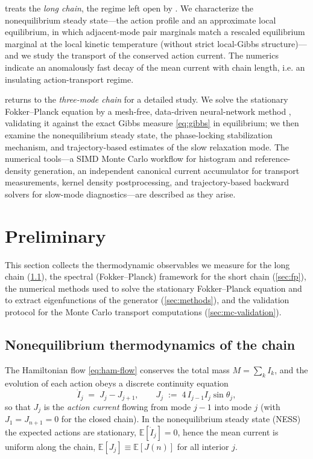\documentclass[11pt,a4paper]{article}
\theoremstyle{definition}
\newcommand{\E}{\mathbb{E}}
\numberwithin{equation}{section}   %
\begin{document}
 treats the \emph{long chain}, the regime left open by
\cite{HLNS}. We characterize the nonequilibrium steady state---the action
profile and an approximate local equilibrium, in which adjacent-mode pair
marginals match a rescaled equilibrium marginal at the local kinetic temperature
(without strict local-Gibbs structure)---and we study the transport of the
conserved action current. The numerics indicate an anomalously fast decay of
the mean current with chain length, i.e. an insulating action-transport regime.

 returns to the \emph{three-mode chain} for a detailed
study. We solve the stationary Fokker--Planck equation by a mesh-free,
data-driven neural-network method \cite{ZhaiDobsonLi}, validating it against the
exact Gibbs measure \eqref{eq:gibbs} in equilibrium; we then examine the
nonequilibrium steady state, the phase-locking stabilization mechanism, and
trajectory-based estimates of the slow relaxation mode. The numerical tools---a
SIMD Monte Carlo workflow for histogram and reference-density generation, an
independent canonical current accumulator for transport measurements, kernel
density postprocessing, and trajectory-based backward solvers for slow-mode
diagnostics---are described as they arise.


\section{Preliminary}

This section collects the thermodynamic observables we measure for the long
chain (\cref{sec:thermo}), the spectral (Fokker--Planck) framework for the
short chain (\cref{sec:fp}), the numerical methods used to solve the stationary
Fokker--Planck equation and to extract eigenfunctions of the generator
(\cref{sec:methods}), and the validation protocol for the Monte Carlo
transport computations (\cref{sec:mc-validation}).

\subsection{Nonequilibrium thermodynamics of the chain}\label{sec:thermo}

The Hamiltonian flow \eqref{eq:ham-flow} conserves the total mass
$M=\sum_k I_k$, and the evolution of each action obeys a discrete continuity
equation
\begin{equation}\label{eq:continuity}
  \dot I_j \;=\; J_j - J_{j+1},
  \qquad
  J_j \;:=\; 4\, I_{j-1} I_j \sin\theta_j ,
\end{equation}
so that $J_j$ is the \emph{action current} flowing from mode $j-1$ into mode
$j$ (with $J_1=J_{n+1}=0$ for the closed chain). In the nonequilibrium steady
state (NESS) the expected actions are stationary, $\E[\dot I_j]=0$, hence the
mean current is uniform along the chain, $\E[J_j]\equiv \E[J(n)]$ for all interior
$j$.
\end{document}
